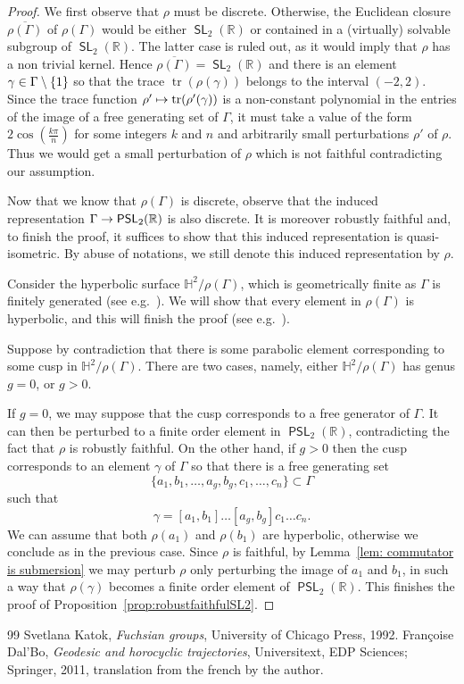 \documentclass[10pt,a4paper]{amsart}
\DeclareMathOperator{\SL}{\mathsf{SL}}
\DeclareMathOperator{\PSL}{\mathsf{PSL}}
\DeclareMathOperator{\tr}{tr}
\newcommand{\R}{\mathbb{R}}
\newcommand{\HH}{\mathbb{H}}
\renewcommand*{\to}{\mathchoice{\longrightarrow}{\rightarrow}{\rightarrow}{\rightarrow}}
\let\oldmapsto\mapsto
\renewcommand*{\mapsto}{\mathchoice{\longmapsto}{\oldmapsto}{\oldmapsto}{\oldmapsto}}
\let\oldin\in
\renewcommand{\in}{\mathchoice{\oldin}{\oldin}{\,\oldin\,}{\,\oldin\,}}
\numberwithin{equation}{section}
\theoremstyle{definition}\newtheorem{defi}[theo]{Definition}
\begin{document}
\begin{proof}
We first observe that $\rho$ must be discrete.
Otherwise, the Euclidean closure $\overline{\rho(\Gamma)}$ of $\rho(\Gamma)$ would be either $\SL_2(\R)$ or contained in a (virtually) solvable subgroup of $\SL_2(\R)$. The latter case is ruled out, as it would imply that $\rho$ has a non trivial kernel. Hence $\overline{\rho(\Gamma)} = \SL_2(\R)$ and there is an element $\gamma\in\Gamma\setminus\{1\}$ so that the trace $\tr(\rho(\gamma))$ belongs to the interval $(-2,2)$. Since the trace function $\rho' \mapsto \tr(\rho'(\gamma))$ is a non-constant polynomial in the entries of the image of a free generating set of $\Gamma$, it must take a value of the form 
$2 \cos(\frac{k \pi}{n})$ for some integers $k$ and $n$ and arbitrarily small perturbations $\rho'$ of $\rho$. Thus we would get a small perturbation of $\rho$ which is not faithful contradicting our assumption.

Now that we know that $\rho(\Gamma)$ is discrete, observe that the induced representation $\Gamma\to\PSL_2(\R)$ is also discrete. It is moreover robustly faithful and, to finish the proof, it suffices to show that this induced representation is quasi-isometric. By abuse of notations, we still denote this induced representation by $\rho$.

Consider the hyperbolic surface $\HH^2/\rho(\Gamma)$, which is geometrically finite as $\Gamma$ is finitely generated (see e.g.~\cite[Theorem~4.6.1]{skatok}). We will show that every element in $\rho(\Gamma)$ is hyperbolic, and this will finish the proof (see e.g.~\cite[Theorems~4.8 \& 4.13 and Corollary~4.17]{dalbogeodesichorocyclic}).



Suppose by contradiction that there is some parabolic element corresponding to some cusp in $\HH^2/\rho(\Gamma)$. There are two cases, namely, either $\HH^2/\rho(\Gamma)$ has genus $g=0$, or $g>0$.

If $g=0$, we may suppose that the cusp corresponds to a free generator of $\Gamma$.
It can then be perturbed to a finite order element in $\PSL_2(\R)$, contradicting the fact that $\rho$ is robustly faithful. On the other hand, if $g>0$ then the cusp corresponds to an element $\gamma$ of $\Gamma$ so that there is a free generating set
\[
\{a_1,b_1,\dots,a_g,b_g,c_1,\dots,c_n\}\subset\Gamma
\]
such that
\[
\gamma=[a_1,b_1]\dots[a_g,b_g]c_1\dots c_n.
\]
We can assume that both $\rho(a_1)$ and $\rho(b_1)$ are hyperbolic, otherwise we conclude as in the previous case. Since $\rho$ is faithful, by Lemma~\ref{lem: commutator is submersion} we may perturb $\rho$ only perturbing the image of $a_1$ and $b_1$, in such a way that $\rho(\gamma)$ becomes a finite order element of $\PSL_2(\R)$. This finishes the proof of Proposition~\ref{prop:robustfaithfulSL2}.
\end{proof}

\begin{thebibliography}{99}
 Svetlana Katok, \emph{Fuchsian groups}, University of Chicago Press, 1992.
 Fran\c{c}oise Dal'Bo, \emph{Geodesic and horocyclic trajectories}, Universitext, EDP Sciences; Springer, 2011, translation from the french by the author.
\end{thebibliography}
\end{document}
